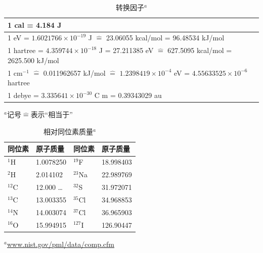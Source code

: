 \documentclass[12pt,a4paper,openany]{ctexbook}
\begin{document}
\begin{table}[htbp]
  \centering
  \begin{threeparttable}
    \caption{转换因子$^a$}
    \label{tabA.2}
    \begin{tabular}{l}
      \toprule
      1 cal = 4.184 J \\
      \midrule
      1 eV = $1.6021766 \times 10^{-19}$ J $\hat{=}$ 23.06055 kcal/mol = 96.48534 kJ/mol \\
      \midrule
      1 hartree = $4.359744 \times 10^{-18}$ J = 27.211385 eV $\hat{=}$ 627.5095 kcal/mol = 2625.500 kJ/mol \\
      \midrule
      1 cm$^{-1}$ $\hat{=}$ 0.011962657 kJ/mol $\hat{=}$ $1.2398419 \times 10^{-4}$ eV = $4.55633525 \times 10^{-6}$ hartree \\
      \midrule
      1 debye = $3.335641 \times 10^{-30}$ C m = 0.39343029 au \\
      \bottomrule
    \end{tabular}
    \begin{tablenotes}
      \small
      \item $^a$记号$\hat{=}$表示“相当于”
    \end{tablenotes}
  \end{threeparttable}
\end{table}

\begin{table}[htbp]
  \centering
  \begin{threeparttable}
    \caption{相对同位素质量$^a$}
    \label{tabA.3}
    \begin{tabular}{l l l l}
      \toprule
      同位素 & 原子质量 & 同位素 & 原子质量 \\
      \midrule
      $^1$H & 1.0078250 & $^{19}$F & 18.998403 \\
      $^2$H & 2.014102 & $^{23}$Na & 22.989769 \\
      $^{12}$C & 12.000 … & $^{32}$S & 31.972071 \\
      $^{13}$C & 13.003355 & $^{35}$Cl & 34.968853 \\
      $^{14}$N & 14.003074 & $^{37}$Cl & 36.965903 \\
      $^{16}$O & 15.994915 & $^{127}$I & 126.90447 \\
      \bottomrule
    \end{tabular}
    \begin{tablenotes}
      \small
      \item $^a$\url{www.nist.gov/pml/data/comp.cfm}
    \end{tablenotes}
  \end{threeparttable}
\end{table}
\end{document}
